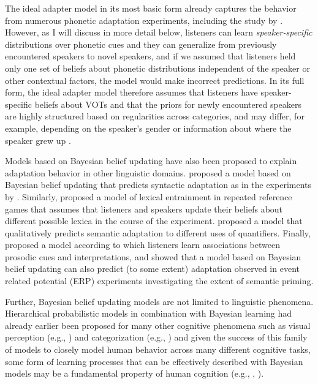 The ideal adapter model in its most basic form already captures the behavior from numerous phonetic adaptation experiments, including the study by \cite{Norris2003}. However, as I will discuss in more detail below,
listeners can learn \textit{speaker-specific} distributions over phonetic cues and they can generalize from previously encountered speakers to novel speakers, and if we assumed that listeners held only 
one set of beliefs about phonetic distributions independent of the speaker or other contextual factors, the model would make incorrect predictions. In its full form, the ideal adapter model therefore assumes that 
listeners have speaker-specific beliefs about VOTs and that the priors for newly encountered speakers are highly structured based on regularities across categories, and may differ, for example, depending on the speaker's gender or
information about where the speaker grew up \cite{Kleinschmidt2019}.

Models based on Bayesian belief updating have also been proposed to explain adaptation behavior in other linguistic domains. \cite{Kleinschmidtetal2012} proposed a model based on Bayesian belief updating that predicts syntactic adaptation as in the experiments by \cite{FineEtAl2013}. Similarly, \cite{Hawkins2018} proposed a model of lexical entrainment in repeated reference games that assumes that listeners and speakers update their beliefs about different possible lexica in the course of the experiment. \cite{Qing2014} proposed a model that qualitatively predicts semantic adaptation to different uses of quantifiers. Finally, \cite{RoettgerFranke2018} proposed a model according to which listeners learn associations between prosodic cues and interpretations, and \cite{DelaneyBuschEtAl2019} showed that a model based on Bayesian belief updating can also predict (to some extent) adaptation observed in event related potential (ERP) experiments investigating the extent of semantic priming.

Further, Bayesian belief updating models are not limited to linguistic phenomena. Hierarchical probabilistic models in combination with Bayesian learning 
had already earlier been proposed for many other cognitive phenomena such as visual perception (e.g., \cite{Clark2013}) and categorization (e.g., \cite{Tenenbaum2011})
and given the success of this family of models to closely model human behavior across many different cognitive tasks, some form of learning processes that can 
be effectively described with Bayesian models may be a fundamental property of human cognition (e.g., \cite{Clark2013}, \cite{Friston2010}).

